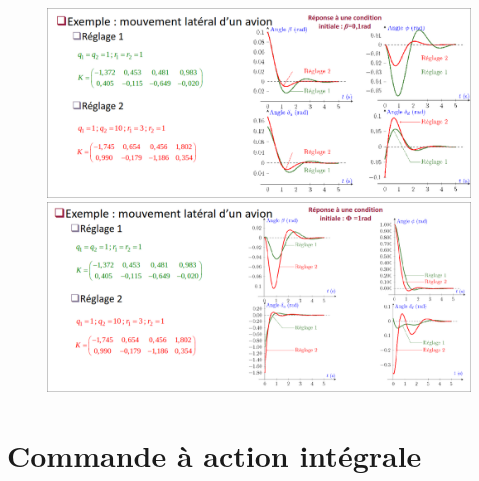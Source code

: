 {{{\begin{figure}[hbt!]
    \includegraphics[scale=0.25]{Pics/reglage1_LQ.png}
    \includegraphics[scale=0.25]{Pics/reglage2_LQ.png}
\end{figure}
\newpage
\section{Commande à action intégrale}
}}}
